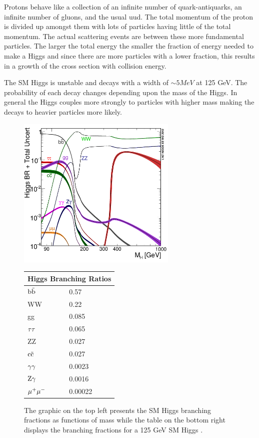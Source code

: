 Protons behave like a collection of an infinite number of quark-antiquarks, an infinite number of gluons, and the usual uud. The total momentum of the proton is divided up amongst them with lots of particles having little of the total momentum. The actual scattering events are between these more fundamental particles. The larger the total energy the smaller the fraction of energy needed to make a Higgs and since there are more particles with a lower fraction, this results in a growth of the cross section with collision energy. 

The SM Higgs is unstable and decays with a width of $\sim 5 MeV$ at 125 GeV. The probability of each decay changes depending upon the mass of the Higgs. In general the Higgs couples more strongly to particles with higher mass making the decays to heavier particles more likely.  

\begin{figure}[h!]
  \centering
  \includegraphics[width=3in]{images/Higgs_BR.png}
  \begin{tabular}{ |l|l| }
    \hline
    \multicolumn{2}{|c|}{Higgs Branching Ratios} \\
    \hline
    ${\rm b\tilde{b}}$ & 0.57 \\
    WW & 0.22\\
    gg & 0.085 \\
    ${\rm \tau\tau}$ & 0.065 \\
    ZZ & 0.027 \\
    ${\rm c\tilde{c}}$ & 0.027 \\
    ${\rm \gamma\gamma}$ & 0.0023 \\
    ${\rm Z}\gamma$ & 0.0016 \\
    ${\rm \mu^{+}\mu^{-}}$ & 0.00022 \\
    \hline
  \end{tabular} 
  \caption
{The graphic on the top left presents the SM Higgs branching fractions as functions of mass while the table on the bottom right displays the branching fractions for a 125 GeV SM Higgs \cite{crossbranchplots}.}
  \label{fig:hbranch}
\end{figure}

